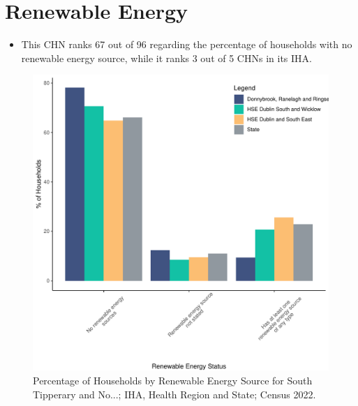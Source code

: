 \documentclass{article}
\begin{document}
\section{Renewable Energy}\label{sect:RE}
\begin{itemize}
\item This CHN ranks  67 out of 96 regarding the percentage of households with no renewable energy source, while it ranks   3 out of 5 CHNs in its IHA.
\end{itemize}
\begin{figure}[H]
	\centering
	\includegraphics[width = 140mm]{../figures/RenewableEnergyED.pdf}
	\caption{Percentage of Households by Renewable Energy Source for South Tipperary and No...; IHA, Health Region and State; Census 2022.}
	\label{fig:vbnv}
	\end{figure}
\end{document}
